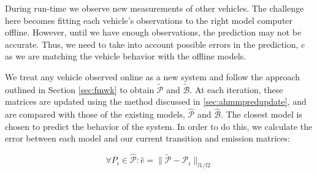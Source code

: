 \documentclass[letterpaper, 10 pt, conference]{ieeeconf}  %
\newcommand\NB[1]{$\spadesuit$\footnote{NB: #1}}
\begin{document}

During run-time we observe new measurements of other vehicles. The challenge here becomes fitting each vehicle's observations to the right model computer offline. However, until we have enough observations, the prediction may not be accurate. Thus, we need to take into account possible errors in the prediction, $e$ as we are matching the vehicle behavior with the offline models. 



We treat any vehicle observed online as a new system and follow the approach outlined in Section \ref{sec:fmwk} to obtain $\tilde{\mathcal{P}}$ and $\tilde{\mathcal{B}}$. At each iteration, these matrices are updated using the method discussed in \ref{sec:ahmmpredupdate}, and are compared with those of the existing models, $\hat{\mathcal{P}}$ and $\hat{\mathcal{B}}$. The closest model is chosen to predict the behavior of the system. In order to do this, we calculate the error between each model and our current transition and emission matrices:

\begin{equation}
    \forall{P_i} \in \hat{\mathcal{P}}: \hat{e} = \lVert\tilde{\mathcal{P}}-\hat{\mathcal{P}}_{i}\rVert_{l1/l2}
\end{equation}
\end{document}
